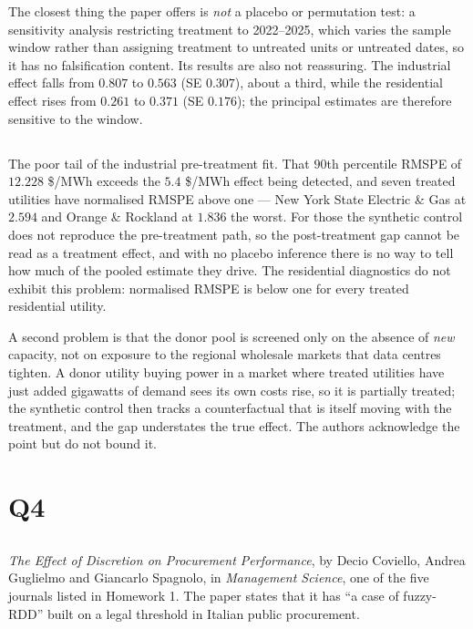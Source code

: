 \documentclass[11pt]{article}
\begin{document}
The closest thing the paper offers is \emph{not} a placebo or permutation
test: a sensitivity analysis restricting treatment to 2022--2025, which varies
the sample window rather than assigning treatment to untreated units or
untreated dates, so it has no falsification content. Its results are also not
reassuring. The industrial effect falls from $0.807$ to $0.563$ (SE $0.307$),
about a third, while the residential effect rises from $0.261$ to $0.371$
(SE $0.176$); the principal estimates are therefore sensitive to the window.

\subsection{}
The poor tail of the industrial pre-treatment fit. That $90$th percentile
RMSPE of $12.228$ \$/MWh exceeds the $5.4$ \$/MWh effect being detected, and
seven treated utilities have normalised RMSPE above one --- New York State
Electric \& Gas at $2.594$ and Orange \& Rockland at $1.836$ the worst. For
those the synthetic control does not reproduce the pre-treatment path, so the
post-treatment gap cannot be read as a treatment effect, and with no placebo
inference there is no way to tell how much of the pooled estimate they drive.
The residential diagnostics do not exhibit this problem: normalised RMSPE is
below one for every treated residential utility.

A second problem is that the donor pool is screened only on the absence of
\emph{new} capacity, not on exposure to the regional wholesale markets that
data centres tighten. A donor utility buying power in a market where treated
utilities have just added gigawatts of demand sees its own costs rise, so it
is partially treated; the synthetic control then tracks a counterfactual that
is itself moving with the treatment, and the gap understates the true effect.
The authors acknowledge the point but do not bound it.

\clearpage
\section{Q4}
\label{sec:q4}

\subsection{}
\emph{The Effect of Discretion on Procurement Performance}, by Decio
Coviello, Andrea Guglielmo and Giancarlo Spagnolo, in \emph{Management
Science}, one of the five journals listed in Homework 1. The paper states that
it has ``a case of fuzzy-RDD'' built on a legal threshold in Italian public
procurement.
\end{document}
